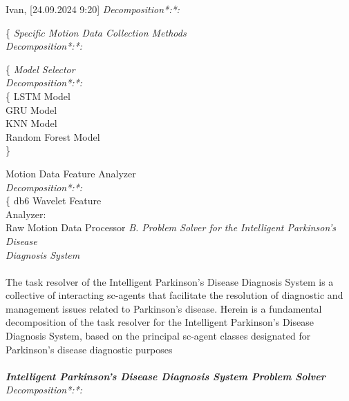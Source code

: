 \documentclass[a4paper,10pt,twocolumn]{article}
\begin{document}
Ivan, [24.09.2024 9:20]
\Rightarrow \textit{Decomposition*:*:} 
 
     \{ \bullet  \textit{Specific Motion Data Collection Methods}\\
        \Rightarrow \textit{Decomposition*:*:}
        
            \begin{itemize}
                 \{ \bullet  \textit{Model Selector}\\
               \Rightarrow \textit{Decomposition*:*:}  \\
                  \{ \bullet  LSTM Model\\
                    \bullet    GRU Model\\
                     \bullet   KNN Model\\
                     \bullet   Random Forest Model\\
                        \}\\
             \end{itemize}
 \bullet   Motion Data Feature Analyzer \\
  \Rightarrow \textit{Decomposition*:*:}\\
\{ \bullet db6 Wavelet Feature\\
Analyzer:\\
\bullet Raw Motion Data Processor                     
\textit{B. Problem Solver for the Intelligent Parkinson’s Disease\\
Diagnosis System}\\
  \\  The task resolver of the Intelligent Parkinson’s Disease Diagnosis System is a collective of interacting sc-agents that facilitate the resolution of diagnostic and
management issues related to Parkinson’s disease. Herein
is a fundamental decomposition of the task resolver for
the Intelligent Parkinson’s Disease Diagnosis System,
based on the principal sc-agent classes designated for
Parkinson’s disease diagnostic purposes      \\
\\
\textbf{\textit{Intelligent Parkinson’s Disease Diagnosis System Problem
Solver}}\\
\Rightarrow \textit{Decomposition*:*:} 
\end{document}
